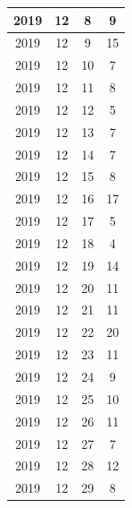 \begin{longtable} {|c|c|c|c|}
\hline
2019         & 12           & 8            & 9                         \\ 
\hline
2019         & 12           & 9            & 15                        \\ 
\hline
2019         & 12           & 10           & 7                         \\ 
\hline
2019         & 12           & 11           & 8                         \\ 
\hline
2019         & 12           & 12           & 5                         \\ 
\hline
2019         & 12           & 13           & 7                         \\ 
\hline
2019         & 12           & 14           & 7                         \\ 
\hline
2019         & 12           & 15           & 8                         \\ 
\hline
2019         & 12           & 16           & 17                        \\ 
\hline
2019         & 12           & 17           & 5                         \\ 
\hline
2019         & 12           & 18           & 4                         \\ 
\hline
2019         & 12           & 19           & 14                        \\ 
\hline
2019         & 12           & 20           & 11                        \\ 
\hline
2019         & 12           & 21           & 11                        \\ 
\hline
2019         & 12           & 22           & 20                        \\ 
\hline
2019         & 12           & 23           & 11                        \\ 
\hline
2019         & 12           & 24           & 9                         \\ 
\hline
2019         & 12           & 25           & 10                        \\ 
\hline
2019         & 12           & 26           & 11                        \\ 
\hline
2019         & 12           & 27           & 7                         \\ 
\hline
2019         & 12           & 28           & 12                        \\ 
\hline
2019         & 12           & 29           & 8                         \\ 

\end{longtable}
